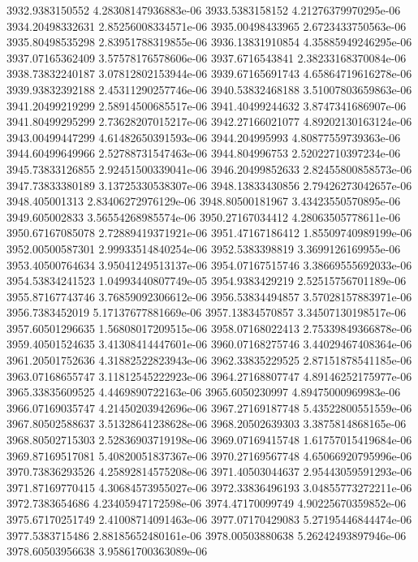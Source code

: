 {3932.9383150552 4.28308147936883e-06
3933.5383158152 4.21276379970295e-06
3934.20498332631 2.85256008334571e-06
3935.00498433965 2.6723433750563e-06
3935.80498535298 2.83951788319855e-06
3936.13831910854 4.35885949246295e-06
3937.07165362409 3.57578176578606e-06
3937.6716543841 2.38233168370084e-06
3938.73832240187 3.07812802153944e-06
3939.67165691743 4.65864719616278e-06
3939.93832392188 2.45311290257746e-06
3940.53832468188 3.51007803659863e-06
3941.20499219299 2.58914500685517e-06
3941.40499244632 3.8747341686907e-06
3941.80499295299 2.73628207015217e-06
3942.27166021077 4.89202130163124e-06
3943.00499447299 4.61482650391593e-06
3944.204995993 4.80877559739363e-06
3944.60499649966 2.52788731547463e-06
3944.804996753 2.52022710397234e-06
3945.73833126855 2.92451500339041e-06
3946.20499852633 2.82455800858573e-06
3947.73833380189 3.13725330538307e-06
3948.13833430856 2.79426273042657e-06
3948.405001313 2.83406272976129e-06
3948.80500181967 3.43423550570895e-06
3949.605002833 3.56554268985574e-06
3950.27167034412 4.28063505778611e-06
3950.67167085078 2.72889419371921e-06
3951.47167186412 1.85509740989199e-06
3952.00500587301 2.99933514840254e-06
3952.5383398819 3.3699126169955e-06
3953.40500764634 3.95041249513137e-06
3954.07167515746 3.38669555692033e-06
3954.53834241523 1.04993440807749e-05
3954.9383429219 2.52515756701189e-06
3955.87167743746 3.76859092306612e-06
3956.53834494857 3.57028157883971e-06
3956.7383452019 5.17137677881669e-06
3957.13834570857 3.34507130198517e-06
3957.60501296635 1.56808017209515e-06
3958.07168022413 2.75339849366878e-06
3959.40501524635 3.41308414447601e-06
3960.07168275746 3.44029467408364e-06
3961.20501752636 4.31882522823943e-06
3962.33835229525 2.87151878541185e-06
3963.07168655747 3.11812545222923e-06
3964.27168807747 4.89146252175977e-06
3965.33835609525 4.4469890722163e-06
3965.6050230997 4.89475000969983e-06
3966.07169035747 4.21450203942696e-06
3967.27169187748 5.43522800551559e-06
3967.80502588637 3.51328641238628e-06
3968.20502639303 3.3875814868165e-06
3968.80502715303 2.52836903719198e-06
3969.07169415748 1.61757015419684e-06
3969.87169517081 5.40820051837367e-06
3970.27169567748 4.65066920795996e-06
3970.73836293526 4.25892814575208e-06
3971.40503044637 2.95443059591293e-06
3971.87169770415 4.30684573955027e-06
3972.33836496193 3.04855773272211e-06
3972.7383654686 4.23405947172598e-06
3974.47170099749 4.90225670359852e-06
3975.67170251749 2.41008714091463e-06
3977.07170429083 5.27195446844474e-06
3977.5383715486 2.88185652480161e-06
3978.00503880638 5.26242493897946e-06
3978.60503956638 3.95861700363089e-06
}

